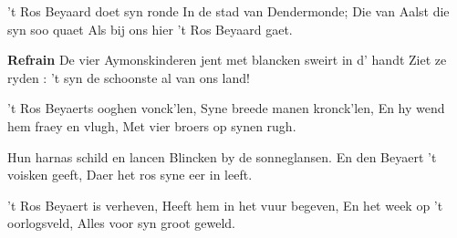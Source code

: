 \footnotemark [
ititle={Ros Beyaert, 't}]


\beginverse
't Ros Beyaard doet syn ronde
In de stad van Dendermonde;
Die van Aalst die syn soo quaet
Als bij ons hier 't Ros Beyaard gaet.
\endverse

\beginchorus
\textbf{Refrain}
De vier Aymonskinderen jent met blancken sweirt in d' handt
Ziet ze ryden : 't syn de schoonste al van ons land!
\endchorus

\beginverse
't Ros Beyaerts ooghen vonck'len,
Syne breede manen kronck'len,
En hy wend hem fraey en vlugh,
Met vier broers op synen rugh.
\endverse

\beginverse
Hun harnas schild en lancen
Blincken by de sonneglansen.
En den Beyaert 't voisken geeft,
Daer het ros syne eer in leeft.
\endverse

\beginverse
't Ros Beyaert is verheven,
Heeft hem in het vuur begeven,
En het week op 't oorlogsveld,
Alles voor syn groot geweld.
\endverse
\endsong